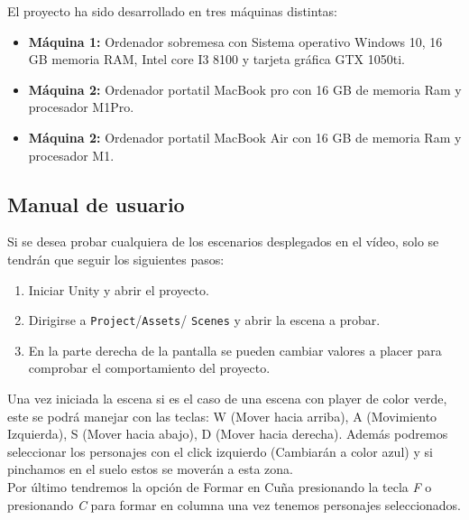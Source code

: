 El proyecto ha sido desarrollado en tres máquinas distintas:
\begin{itemize}
    \item \textbf{Máquina 1:} Ordenador sobremesa con Sistema operativo Windows 10, 16 GB memoria RAM, Intel core I3 8100 y tarjeta gráfica GTX 1050ti.
    \item \textbf{Máquina 2:} Ordenador portatil MacBook pro con 16 GB de memoria Ram y procesador M1Pro.
     \item \textbf{Máquina 2:} Ordenador portatil MacBook Air con 16 GB de memoria Ram y procesador M1.
\end{itemize}

\subsection{Manual de usuario}
Si se desea probar cualquiera de los escenarios desplegados en el vídeo, solo se tendrán que seguir los siguientes pasos:
\begin{enumerate}
    \item Iniciar Unity y abrir el proyecto.
    \item Dirigirse a \texttt{Project}/\texttt{Assets}/ \texttt{Scenes} y abrir la escena a probar. 
    \item En la parte derecha de la pantalla se pueden cambiar valores a placer para comprobar el comportamiento del proyecto.
\end{enumerate}
Una vez iniciada la escena si es el caso de una escena con player de color verde, este se podrá manejar con las teclas: W (Mover hacia arriba), A (Movimiento Izquierda), S (Mover hacia abajo), D (Mover hacia derecha). Además podremos seleccionar los personajes con el click izquierdo (Cambiarán a color azul) y si pinchamos en el suelo estos se moverán a esta zona.\\

Por último tendremos la opción de Formar en Cuña presionando la tecla \textit{F} o presionando \textit{C} para formar en columna una vez tenemos personajes seleccionados.

